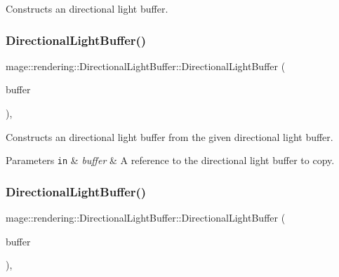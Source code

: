 Constructs an directional light buffer. \mbox{\label{structmage_1_1rendering_1_1_directional_light_buffer_a8bd677130e2bc44b721935396f3ee9ac}} 
\subsubsection{\texorpdfstring{Directional\+Light\+Buffer()}{DirectionalLightBuffer()}\hspace{0.1cm}{\footnotesize\ttfamily [2/3]}}
{\footnotesize\ttfamily mage\+::rendering\+::\+Directional\+Light\+Buffer\+::\+Directional\+Light\+Buffer (\begin{DoxyParamCaption}\item[{const \mbox{\hyperlink{structmage_1_1rendering_1_1_directional_light_buffer}{Directional\+Light\+Buffer}} \&}]{buffer }\end{DoxyParamCaption})\hspace{0.3cm}{\ttfamily [default]}, {\ttfamily [noexcept]}}

Constructs an directional light buffer from the given directional light buffer.


\begin{DoxyParams}[1]{Parameters}
\mbox{\tt in}  & {\em buffer} & A reference to the directional light buffer to copy. \\
\hline
\end{DoxyParams}
\mbox{\label{structmage_1_1rendering_1_1_directional_light_buffer_a2db095d74145a02eb6c6c306501b04e8}} 
\subsubsection{\texorpdfstring{Directional\+Light\+Buffer()}{DirectionalLightBuffer()}\hspace{0.1cm}{\footnotesize\ttfamily [3/3]}}
{\footnotesize\ttfamily mage\+::rendering\+::\+Directional\+Light\+Buffer\+::\+Directional\+Light\+Buffer (\begin{DoxyParamCaption}\item[{\mbox{\hyperlink{structmage_1_1rendering_1_1_directional_light_buffer}{Directional\+Light\+Buffer}} \&\&}]{buffer }\end{DoxyParamCaption})\hspace{0.3cm}{\ttfamily [default]}, {\ttfamily [noexcept]}}

